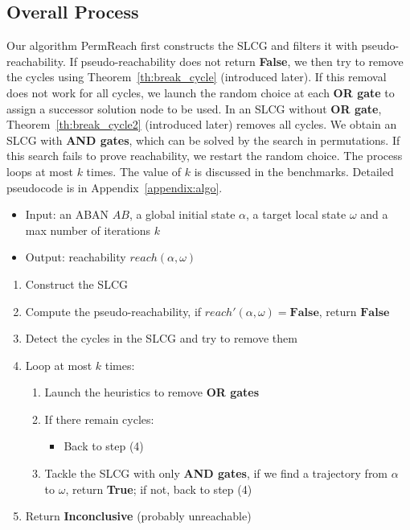 \documentclass[runningheads]{llncs}
\begin{document}
\subsection{Overall Process}\label{sectOverall}
Our algorithm PermReach first constructs the SLCG and filters it with pseudo-reachability. 
If pseudo-reachability does not return \textbf{False}, we then try to remove the cycles using Theorem~\ref{th:break_cycle} (introduced later).
If this removal does not work for all cycles, we launch the random choice at each \textbf{OR gate} to assign a successor solution node to be used.
In an SLCG without \textbf{OR gate}, Theorem~\ref{th:break_cycle2} (introduced later) removes all cycles.
We obtain an SLCG with \textbf{AND gates}, which can be solved by the search in permutations.
If this search fails to prove reachability, we restart the random choice.
The process loops at most $k$ times.
The value of $k$ is discussed in the benchmarks.
Detailed pseudocode is in Appendix~\ref{appendix:algo}.
\begin{itemize}
    \item Input: an ABAN $AB$, a global initial state $\alpha$, a target local state $\omega$ and a max number of iterations $k$
    \item Output: reachability $reach(\alpha, \omega)$
\end{itemize}
\begin{enumerate}
\item Construct the SLCG
\item Compute the pseudo-reachability, if $reach'(\alpha,\omega)=\mathbf{False}$, return $\mathbf{False}$
\item Detect the cycles in the SLCG and try to remove them 
\item Loop at most $k$ times:
\begin{enumerate}
    \item Launch the heuristics to remove \textbf{OR gates} 
    \item If there remain cycles:
    \begin{itemize}
        \item Back to step (4)
    \end{itemize}
    \item Tackle the SLCG with only \textbf{AND gates}, if we find a trajectory from $\alpha$ to $\omega$, return \textbf{True}; if not, back to step (4)
\end{enumerate}
\item Return \textbf{Inconclusive} (probably unreachable)
\end{enumerate}
\end{document}
